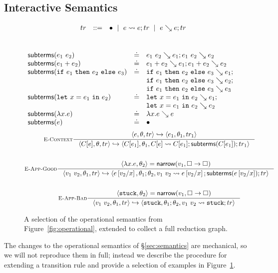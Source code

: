 \subsection{Interactive Semantics}
\label{sec:inter-semant}
%
\begin{figure}[t]
$$
\begin{array}{rrcl}
  & tr & ::= & \bullet \ \mid \  e \leadsto e; tr \ \mid \  e \searrow e; tr
\end{array}
$$
\\
\relDescription{\subtermssym}
\begin{gather*}
\begin{array}{lcl}
\mathsf{subterms}(e_1 \ e_2)   & \doteq & e_1 \ e_2 \searrow e_1; e_1 \ e_2 \searrow e_2 \\
\mathsf{subterms}(e_1 + e_2)   & \doteq & e_1 + e_2 \searrow e_1; e_1 + e_2 \searrow e_2 \\
\mathsf{subterms}(\mathtt{if}\ e_1\ \mathtt{then}\ e_2\ \mathtt{else}\ e_3)   & \doteq & \mathtt{if}\ e_1\ \mathtt{then}\ e_2\ \mathtt{else}\ e_3 \searrow e_1; \\
                                &        & \mathtt{if}\ e_1\ \mathtt{then}\ e_2\ \mathtt{else}\ e_3 \searrow e_2; \\
                                &        & \mathtt{if}\ e_1\ \mathtt{then}\ e_2\ \mathtt{else}\ e_3 \searrow e_3 \\
\mathsf{subterms}(\mathtt{let}\ x = e_1\ \mathtt{in}\ e_2)   & \doteq & \mathtt{let}\ x = e_1\ \mathtt{in}\ e_2 \searrow e_1; \\
                                &        & \mathtt{let}\ x = e_1\ \mathtt{in}\ e_2 \searrow e_2 \\
\mathsf{subterms}(\lambda x. e)       & \doteq & \lambda x. e \searrow e \\
\mathsf{subterms}(e)                 & \doteq & \bullet
\end{array}
\end{gather*}
\begin{gather*}
\inference[\recontext]
  {\stepg{e}{\su}{\tr}{e_1}{\su_1}{\tr_1}}
  {\stepg{C[e]}{\su}{\tr}{C[e_1]}{\su_1}{\singlestep{C[e]}{C[e_1]}; \subterms{C[e_1]}; \tr_1}}
\\ \\
\inference[\reappgood]
  {\pair{\efun{x}{e}}{\su_2} = \force{v_1}{\tfun{\thole{}}{\thole{}}}}
  {\stepg{\eapp{v_1}{v_2}}{\su_1}{\tr}
         {e\sub{x}{v_2}}{\su_1;\su_2}{\singlestep{\eapp{v_1}{v_2}}{e\sub{x}{v_2}}; \subterms{e\sub{x}{v_2}}; \tr}}
\\ \\
\inference[\reappbad]
  {\pair{\stuck}{\su_2} = \force{v_1}{\tfun{\thole{}}{\thole{}}}}
  {\stepg{\eapp{v_1}{v_2}}{\su_1}{\tr}{\stuck}{\su_1;\su_2}{\singlestep{\eapp{v_1}{v_2}}{\stuck}; \tr}}
\end{gather*}
\caption{A selection of the operational semantics from
  Figure~\ref{fig:operational}, extended to collect a full reduction
  graph.}
\label{fig:interactive}
\end{figure}
%
The changes to the operational semantics of \S\ref{sec:semantics} are
mechanical, so we will not reproduce them in full; instead we describe
the procedure for extending a transition rule and provide a selection of
examples in Figure~\ref{fig:interactive}.

